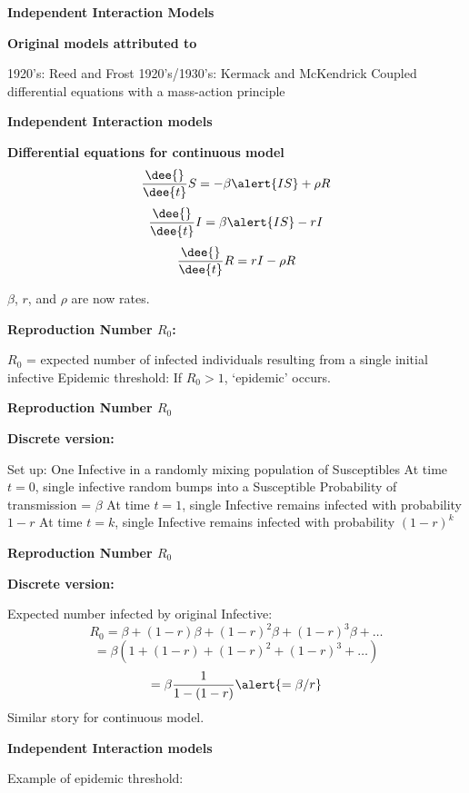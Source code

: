   \textbf{Independent Interaction Models}

  \textbf{Original models attributed to}
    
     1920's: Reed and Frost
     1920's/1930's: Kermack and McKendrick\cite{kermack1927a,kermack1932a,kermack1933a}
     Coupled differential equations with a mass-action principle
    
  


  \textbf{Independent Interaction models}

  \textbf{Differential equations for continuous model}
    $$
    \frac{\dee{}}{\dee{t}} S = - \beta  \alert{I S} + \rho R 
    $$
    $$
    \frac{\dee{}}{\dee{t}} I=  \beta \alert{I S} - r I 
    $$
    $$
    \frac{\dee{}}{\dee{t}} R=  r I - \rho R 
    $$
  
  $\beta$, $r$, and $\rho$ are now \alert{rates}.
  
  \textbf{Reproduction Number $R_0$:}
  
   $R_0$ = expected number of infected individuals resulting
    from a single initial infective
   Epidemic threshold: If $R_0 > 1$, `epidemic' occurs.
  
  


  \textbf{Reproduction Number $R_0$}

  \textbf{Discrete version:}
    
     Set up: One Infective in a randomly mixing population of Susceptibles
     At time $t=0$, single infective random bumps into a Susceptible
     Probability of transmission = $\beta$
     At time $t=1$, single Infective remains infected with probability $1-r$
     At time $t=k$, single Infective remains infected with probability $(1-r)^k$
    
      


  \textbf{Reproduction Number $R_0$}

  \textbf{Discrete version:}
    
     Expected number infected by original Infective:
      $$
      R_0 = \beta + (1-r)\beta + (1-r)^2\beta + (1-r)^3\beta + \ldots
      $$
      {
        $$
        = \beta\left( 1 + (1-r) + (1-r)^2 + (1-r)^3 + \ldots \right)
        $$
      }
      $$
      {= \beta \frac{1}{1 - (1-r)}}
      {\alert{= \beta/r}}
      $$
      {Similar story for continuous model.}
    
  


  \textbf{Independent Interaction models}

  \centering 

  Example of epidemic threshold:

